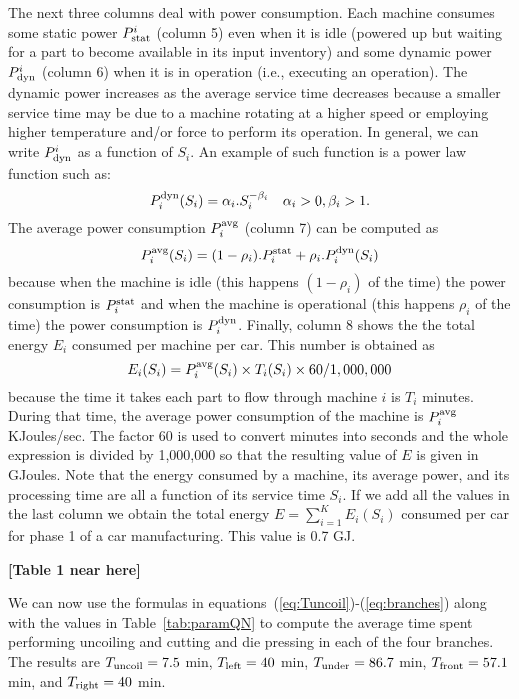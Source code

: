 \documentclass[a4paper, 12pt]{article} %
\begin{document}
The next three columns deal with power consumption. Each machine consumes some static power $P^i_{\rm stat}$ (column 5) even when it is idle (powered up but waiting for a part to become available in its input inventory) and some dynamic power $P^i_{\rm dyn}$ (column 6) when it is in operation (i.e., executing an operation). The dynamic power increases as the average service time decreases because a smaller service time may be due to a  machine rotating at a higher speed or employing higher temperature and/or force to perform its operation. In general, we can write $P^i_{\rm dyn}$ as a function of $S_i$. An example of such function is a power law function such as:
\begin{equation}
P_i^{\rm dyn}  (S_i) = \alpha_i . S_i^{-\beta_i}   ~~~\alpha_i > 0, \beta_i > 1.  \label{eq:pdyn}
\end{equation}
The average power consumption $P_i^{\rm avg}$ (column 7) can be computed as
\begin{equation}
P_i^{\rm avg} (S_i) = (1 - \rho_i). P_i^{\rm stat} + \rho_i . P_i^{\rm dyn} (S_i)
\end{equation}
because when the machine is idle (this happens $(1 - \rho_i)$ of the time) the power consumption is $P_i^{\rm stat}$ and when the machine is operational (this happens $\rho_i$ of the time) the power consumption is $P_i^{\rm dyn}$.
Finally, column 8 shows the the total energy $E_i$ consumed per machine per car. This number is obtained as 
\begin{equation}
E_i (S_i) = P_i^{\rm avg} (S_i) \times T_i (S_i) \times 60 /1,000,000
\end{equation}
because the time it takes each part to flow through machine $i$ is  $T_i$ minutes. During that time, the average power consumption of the machine is $P_i^{\rm avg}$ KJoules/sec. The factor 60 is used to convert minutes into seconds and the whole expression is divided by 1,000,000 so that the resulting value of $E$ is given in GJoules. Note that the energy consumed by a machine, its average power, and its processing time are all a function of its service time $S_i$. If we add all the values in the last column we obtain the total energy $E = \sum_{i=1}^K E_i (S_i)$ consumed per car  for phase 1 of a car manufacturing. This value is 0.7 GJ.

{\bf [Table 1 near here]}

We can now use the formulas in equations~(\ref{eq:Tuncoil})-(\ref{eq:branches}) along with the values in Table~\ref{tab:paramQN} to compute the average time spent performing uncoiling and cutting and die pressing in each of the four branches. The results are $T_{\rm uncoil} = 7.5$ min, $T_{\rm left} = 40$ min, $T_{\rm under} = 86.7$ min,  $T_{\rm front} =  57.1$ min, and $T_{\rm right} =  40$ min.
\end{document}
